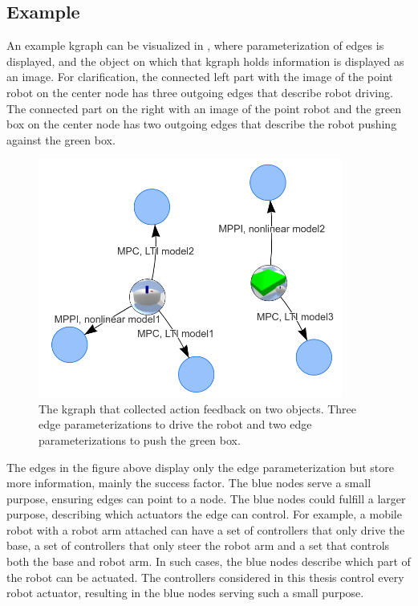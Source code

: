 \subsection{Example}%
\label{subsec:kgraph_example}
An example \ac{kgraph} can be visualized in , where parameterization of edges is displayed, and the object on which that \ac{kgraph} holds information is displayed as an image. For clarification, the connected left part with the image of the point robot on the center node has three outgoing edges that describe robot driving. The connected part on the right with an image of the point robot and the green box on the center node has two outgoing edges that describe the robot pushing against the green box.\bs

\begin{figure}[H]
    \centering
    \includegraphics[width=10cm]{figures/proposed_method/kgraph_example}
    \caption{The \ac{kgraph} that collected action feedback on two objects. Three edge parameterizations to drive the robot and two edge parameterizations to push the green box.}%
    \label{fig:kgraph_example}
\end{figure}

The edges in the figure above display only the edge parameterization but store more information, mainly the success factor. The blue nodes serve a small purpose, ensuring edges can point to a node. The blue nodes could fulfill a larger purpose, describing which actuators the edge can control. For example, a mobile robot with a robot arm attached can have a set of controllers that only drive the base, a set of controllers that only steer the robot arm and a set that controls both the base and robot arm. In such cases, the blue nodes describe which part of the robot can be actuated. The controllers considered in this thesis control every robot actuator, resulting in the blue nodes serving such a small purpose.\bs
